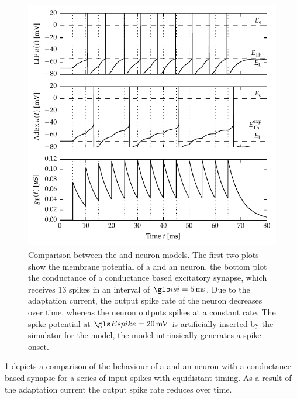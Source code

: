 \begin{figure}
	\centering
	\includegraphics{media/chp2/lif_vs_adex.pdf}
	\caption[Comparison between the LIF and AdEx neuron models]{Comparison between the \LIF and \AdEx neuron models. The first two plots show the membrane potential of a \LIF and an \AdEx neuron, the bottom plot the conductance of a conductance based excitatory synapse, which receives 13 spikes in an interval of $\isi = \SI{5}{\milli\second}$. Due to the adaptation current, the output spike rate of the \AdEx neuron decreases over time, whereas the \LIF neuron outputs spikes at a constant rate. The spike potential at $\Espike = \SI{20}{\milli\volt}$ is artificially inserted by the simulator for the \LIF model, the \AdEx model intrinsically generates a spike onset.}
	\label{fig:lif_vs_adex}
\end{figure}

\cref{fig:lif_vs_adex} depicts a comparison of the behaviour of a \LIF and an \AdEx neuron with a conductance based synapse for a series of input spikes with equidistant timing. As a result of the adaptation current the output spike rate reduces over time.

